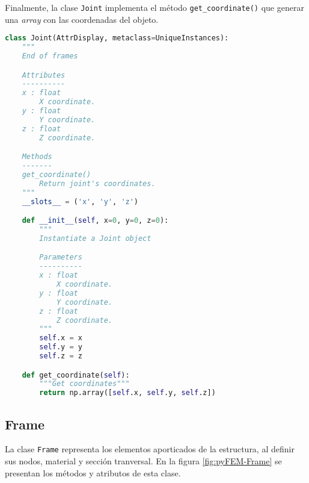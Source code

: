 Finalmente, la clase \verb|Joint| implementa el método \verb|get_coordinate()| que generar una \emph{array} con las coordenadas del objeto.\\

\begin{lstlisting}[language=Python,caption=Clase \texttt{Joint} implementada en el archivo \texttt{primitives.py}.,label=alg:Joint, frame=single]
class Joint(AttrDisplay, metaclass=UniqueInstances):
    """
    End of frames

    Attributes
    ----------
    x : float
        X coordinate.
    y : float
        Y coordinate.
    z : float
        Z coordinate.

    Methods
    -------
    get_coordinate()
        Return joint's coordinates.
    """
    __slots__ = ('x', 'y', 'z')

    def __init__(self, x=0, y=0, z=0):
        """
        Instantiate a Joint object

        Parameters
        ----------
        x : float
            X coordinate.
        y : float
            Y coordinate.
        z : float
            Z coordinate.
        """
        self.x = x
        self.y = y
        self.z = z

    def get_coordinate(self):
        """Get coordinates"""
        return np.array([self.x, self.y, self.z])
\end{lstlisting}

\subsection{Frame}
La clase \verb|Frame| representa los elementos aporticados de la estructura, al definir sus nodos, material y sección tranversal. En la figura \ref{fig:pyFEM-Frame} se presentan los métodos y atributos de esta clase.\\

